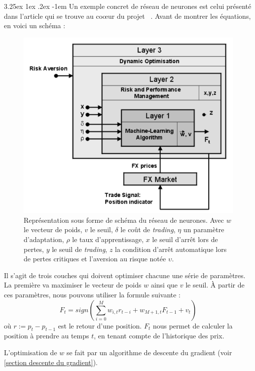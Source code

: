 \documentclass[a4paper, 11pt]{article}
\makeatletter
\renewcommand\paragraph{\@startsection{paragraph}{5}{\z@}%
  {3.25ex \@plus1ex \@minus.2ex}%
  {-1em}%
  {\normalfont\normalsize\bfseries}}
\makeatother
\begin{document}
\paragraph{}
Un exemple concret de réseau de neurones est celui présenté dans l'article qui se trouve au coœur du projet ~\cite{fx_trading}.
Avant de montrer les équations, en voici un schéma \cite{fx_trading}:
\begin{figure}[H]
 \centering
 \includegraphics[scale=0.4]{images/exemple_nn_projet}
 \caption{Représentation sous forme de schéma du réseau de neurones. Avec $w$ le vecteur de poids, $v$ le seuil, $\delta$ le coût de
 \textit{trading}, $\eta$ un paramètre d'adaptation, $\rho$ le taux d'apprentissage, $x$ le seuil d'arrêt lors de pertes, $y$ le
 seuil de \textit{trading}, $z$ la condition d'arrêt automatique lors de pertes critiques et l'aversion au risque notée $\upsilon$.}
\end{figure}

Il s'agit de trois couches qui doivent optimiser chacune une série de paramètres. La première va maximiser le vecteur de poids $w$
ainsi que $v$ le seuil. À partir de ces paramètres, nous pouvons utiliser la formule suivante :
$$F_t = sign(\sum_{i=0}^M w_{i,t} r_{t-i} + w_{M+1,t} F_{t-1} + v_t)$$
où $r := p_t - p_{t-1}$ est le retour d'une position. $F_t$ nous permet de calculer la position à prendre au temps $t$, en tenant
compte de l'historique des prix.

L'optimisation de $w$ se fait par un algorithme de descente du gradient (voir \ref{section descente du gradient}).
\end{document}
